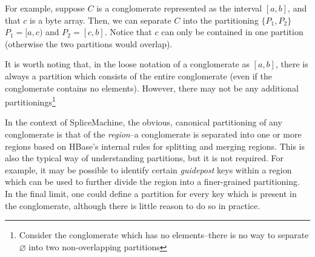 For example, suppose $C$ is a conglomerate represented as the interval $[a,b]$, and that $c$ is a byte array. Then, we can separate $C$ into the partitioning $\lbrace P_1,P_2 \rbrace$ $P_1 = [a,c)$ and $P_2 = [c,b]$. Notice that $c$ can only be contained in one partition (otherwise the two partitions would overlap). 

It is worth noting that, in the loose notation of a conglomerate as $[a,b]$, there is always a partition which consists of the entire conglomerate (even if the conglomerate contains no elements). However, there may not be any additional partitionings\footnote{Consider the conglomerate which has no elements--there is no way to separate $\varnothing$ into two non-overlapping partitions}

In the context of SpliceMachine, the obvious, canonical partitioning of any conglomerate is that of the \emph{region}--a conglomerate is separated into one or more regions based on HBase's internal rules for splitting and merging regions. This is also the typical way of understanding partitions, but it is not required. For example, it may be possible to identify certain \emph{guidepost} keys within a region which can be used to further divide the region into a finer-grained partitioning. In the final limit, one could define a partition for every key which is present in the conglomerate, although there is little reason to do so in practice.



